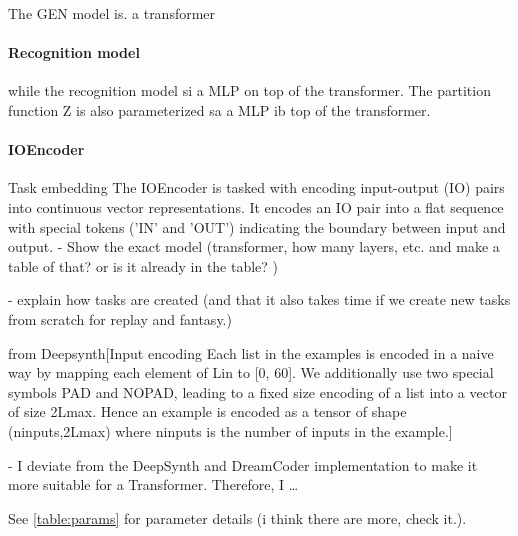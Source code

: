 The GEN model is. a transformer


\paragraph{Recognition model}
while the recognition model si a MLP on top of the transformer. The partition function Z is also parameterized sa a MLP ib top of the transformer. 


\paragraph{IOEncoder}
Task embedding 
The IOEncoder is tasked with encoding input-output (IO) pairs into continuous vector representations.
It encodes an IO pair into a flat sequence with special tokens ('IN' and 'OUT') indicating the boundary between input and output.
- Show the exact model (transformer, how many layers, etc. and make a table of that? or is it already in the table? )

- explain how tasks are created (and that it also takes time if we create new tasks from scratch for replay and fantasy.)

from Deepsynth[Input encoding Each list in the examples is encoded in a naive way by mapping each element of Lin to [0, 60]. We additionally use two special symbols PAD and NOPAD, leading to a fixed size encoding of a list into a vector of size 2Lmax. Hence an example is encoded as a tensor of shape (ninputs,2Lmax) where ninputs is the number of inputs in the example.]

- I deviate from the DeepSynth and DreamCoder implementation to make it more suitable for a Transformer.
Therefore, I \dots


See \ref{table:params} for parameter details (i think there are more, check it.). 



